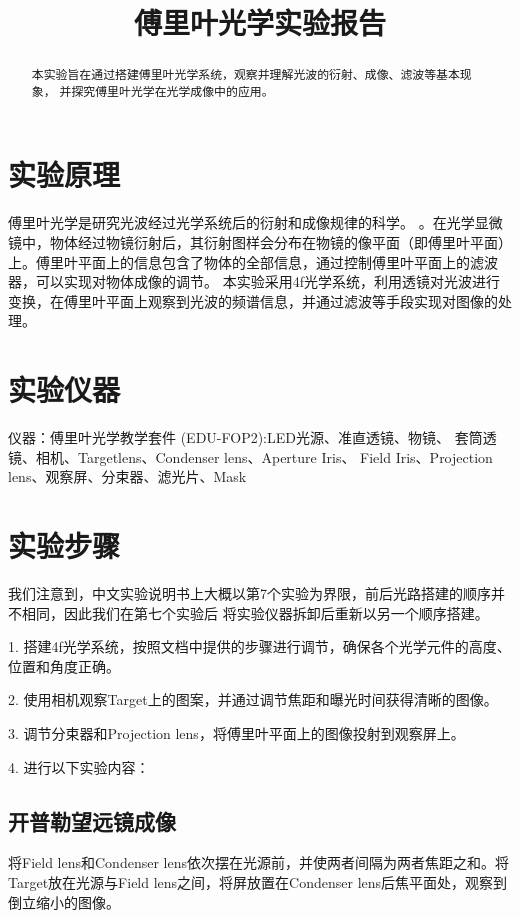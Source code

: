\documentclass{ctexart}
\title{傅里叶光学实验报告}
\begin{document}
\maketitle

\begin{abstract}
  本实验旨在通过搭建傅里叶光学系统，观察并理解光波的衍射、成像、滤波等基本现象，
  并探究傅里叶光学在光学成像中的应用。
\end{abstract}

\section{实验原理}
傅里叶光学是研究光波经过光学系统后的衍射和成像规律的科学。
。在光学显微镜中，物体经过物镜衍射后，其衍射图样会分布在物镜的像平面（即傅里叶平面）上。傅里叶平面上的信息包含了物体的全部信息，通过控制傅里叶平面上的滤波器，可以实现对物体成像的调节。
本实验采用4f光学系统，利用透镜对光波进行变换，在傅里叶平面上观察到光波的频谱信息，并通过滤波等手段实现对图像的处理。

\section{实验仪器}
  仪器：傅里叶光学教学套件 (EDU-FOP2):LED光源、准直透镜、物镜、
  套筒透镜、相机、Targetlens、Condenser lens、Aperture Iris、
  Field Iris、Projection lens、观察屏、分束器、滤光片、Mask

\section{实验步骤}
我们注意到，中文实验说明书上大概以第7个实验为界限，前后光路搭建的顺序并不相同，因此我们在第七个实验后
将实验仪器拆卸后重新以另一个顺序搭建。

1. 搭建4f光学系统，按照文档中提供的步骤进行调节，确保各个光学元件的高度、位置和角度正确。

2. 使用相机观察Target上的图案，并通过调节焦距和曝光时间获得清晰的图像。

3. 调节分束器和Projection lens，将傅里叶平面上的图像投射到观察屏上。

4. 进行以下实验内容：

\subsection{开普勒望远镜成像}
将Field lens和Condenser lens依次摆在光源前，并使两者间隔为两者焦距之和。将Target放在光源与Field lens之间，将屏放置在Condenser lens后焦平面处，观察到倒立缩小的图像。
\end{document}
